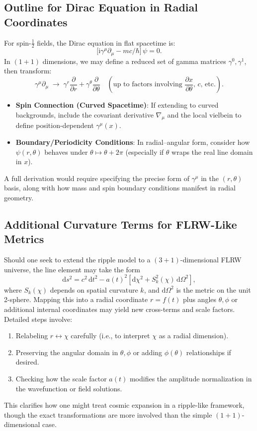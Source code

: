 \documentclass[11pt]{article}
\begin{document}
\subsection{Outline for Dirac Equation in Radial Coordinates}
\label{app:sec:dirac-derivation}
For spin-$\tfrac12$ fields, the Dirac equation in flat spacetime is:
\[
  \bigl[\mathrm{i}\gamma^\mu \partial_\mu - m c/\hbar\bigr]\,\psi = 0.
\]
In $(1+1)$ dimensions, we may define a reduced set of gamma matrices 
$\gamma^0,\gamma^1$, then transform:
\[
  \gamma^\mu \partial_\mu \;\to\; 
  \gamma^r \frac{\partial}{\partial r} + \gamma^\theta \frac{\partial}{\partial \theta}
  \quad(\text{up to factors involving } \frac{\partial x}{\partial \theta},\,c,\,\text{etc.}).
\]
\begin{itemize}
  \item \textbf{Spin Connection (Curved Spacetime)}: If extending to curved backgrounds, 
        include the covariant derivative $\nabla_\mu$ and the local vielbein 
        to define position-dependent $\gamma^\mu(x)$.
  \item \textbf{Boundary/Periodicity Conditions}: In radial--angular form, consider 
        how $\psi(r,\theta)$ behaves under $\theta \mapsto \theta + 2\pi$ 
        (especially if $\theta$ wraps the real line domain in $x$).
\end{itemize}
A full derivation would require specifying the precise form of $\gamma^\mu$ in 
the $(r,\theta)$ basis, along with how mass and spin boundary conditions 
manifest in radial geometry.

\subsection{Additional Curvature Terms for FLRW-Like Metrics}
\label{app:sec:FLRW-derivation}
Should one seek to extend the ripple model to a $(3+1)$-dimensional FLRW 
universe, the line element may take the form
\[
  \mathrm{d}s^2 = c^2\,\mathrm{d}t^2 - a(t)^2 
  \left[\mathrm{d}\chi^2 + S_k^2(\chi)\,\mathrm{d}\Omega^2\right],
\]
where $S_k(\chi)$ depends on spatial curvature $k$, and $\mathrm{d}\Omega^2$ 
is the metric on the unit 2-sphere. Mapping this into a radial coordinate 
$r = f(t)$ plus angles $\theta,\phi$ or additional internal coordinates 
may yield new cross-terms and scale factors. Detailed steps involve:
\begin{enumerate}
  \item Relabeling $r \leftrightarrow \chi$ carefully (i.e., to interpret 
        $\chi$ as a radial dimension).
  \item Preserving the angular domain in $\theta,\phi$ or adding 
        $\phi(\theta)$ relationships if desired.
  \item Checking how the scale factor $a(t)$ modifies the amplitude normalization 
        in the wavefunction or field solutions.
\end{enumerate}
This clarifies how one might treat cosmic expansion in a ripple-like 
framework, though the exact transformations are more involved than 
the simple $(1+1)$-dimensional case.
\end{document}
